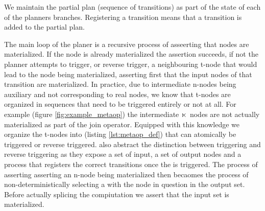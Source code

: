 We maintain the partial plan (sequence of transitions) as part of the
state of each of the planners branches. Registering a transition means
that a transition is added to the partial plan.

The main loop of the planer is a recursive process of asseerting that
nodes are materialized. If the node is already materialized the
assertion succeeds, if not the planner attempts to trigger, or reverse
trigger, a neighbouring t-node that would lead to the node being
materialized, asserting first that the input nodes of that transition
are materialized. In practice, due to intermediate n-nodes being
auxiliary and not corresponding to real nodes, we know that t-nodes
are organized in sequences that need to be triggered entirely or not
at all. For example (figure \ref{fig:example_metaop}) the intermediate
\(\ltimes\) nodes are not actually materialized as part of the join
operator. Equipped with this knowledge we organize the t-nodes into
 (listing \ref{lst:metaop_def}) that can atomically be triggered or
reverse triggered.  also abstract the distinction between
triggering and reverse triggering as they expose a set of input, a set
of output nodes and a process that registers the correct transitions
once the  is triggered. The process of asserting asserting an
n-node being materialized then becaomes the process of
non-deterministically selecting a  with the node in question
in the output set. Before actually splicing the  compiutation
we assert that the input set is materialized.


